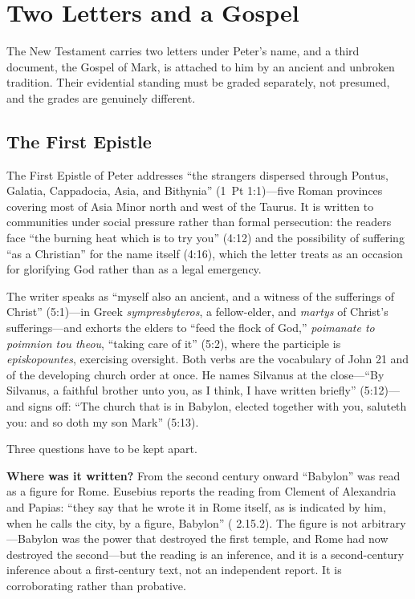 \section{Two Letters and a Gospel}

The New Testament carries two letters under Peter's name, and a third
document, the Gospel of Mark, is attached to him by an ancient and unbroken
tradition. Their evidential standing must be graded separately, not
presumed, and the grades are genuinely different.

\subsection{The First Epistle}

The First Epistle of Peter addresses ``the strangers dispersed through
Pontus, Galatia, Cappadocia, Asia, and Bithynia'' (1~Pt 1:1)---five Roman
provinces covering most of Asia Minor north and west of the Taurus. It is
written to communities under social pressure rather than formal
persecution: the readers face ``the burning heat which is to try you''
(4:12) and the possibility of suffering ``as a Christian'' for the name
itself (4:16), which the letter treats as an occasion for glorifying God
rather than as a legal emergency.

The writer speaks as ``myself also an ancient, and a witness of the
sufferings of Christ'' (5:1)---in Greek \textit{sympresbyteros}, a
fellow-elder, and \textit{martys} of Christ's sufferings---and exhorts the
elders to ``feed the flock of God,'' \textit{poimanate to poimnion tou
theou}, ``taking care of it'' (5:2), where the participle is
\textit{episkopountes}, exercising oversight. Both verbs are the vocabulary
of John 21 and of the developing church order at once. He names Silvanus at
the close---``By Silvanus, a faithful brother unto you, as I think, I have
written briefly'' (5:12)---and signs off: ``The church that is in Babylon,
elected together with you, saluteth you: and so doth my son Mark'' (5:13).

Three questions have to be kept apart.

\textbf{Where was it written?} From the second century onward ``Babylon'' was
read as a figure for Rome. Eusebius reports the reading from Clement of
Alexandria and Papias: ``they say that he wrote it in Rome itself, as is
indicated by him, when he calls the city, by a figure, Babylon''
( 2.15.2). The figure is not arbitrary---Babylon was the
power that destroyed the first temple, and Rome had now destroyed the
second---but the reading is an inference, and it is a second-century
inference about a first-century text, not an independent report. It is
corroborating rather than probative.

